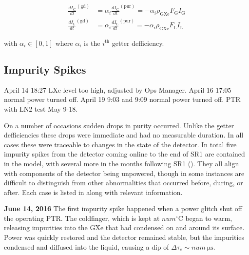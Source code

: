 \begin{subequations}
\begin{align}
\frac{dI_{\mathrm{G}}}{dt}^{(\mathrm{gd})} &= \alpha_i \frac{dI_{\mathrm{G}}}{dt}^{(\mathrm{pur})} =
-\alpha_i \rho_{\mathrm{GXe}} F_{\mathrm{G}} I_{\mathrm{G}}
\label{eq:electron_lifetime_model_detector_effects_getter_gxe}
\\
\frac{dI_{\mathrm{L}}}{dt}^{(\mathrm{gd})} &= \alpha_i \frac{dI_{\mathrm{L}}}{dt}^{(\mathrm{pur})} =
-\alpha_i \rho_{\mathrm{GXe}} F_{\mathrm{L}} I_{\mathrm{L}}
\label{eq:electron_lifetime_model_detector_effects_getter_lxe}
\end{align}
\end{subequations}

\noindent with $\alpha_i \in [0, 1]$ where $\alpha_i$ is the $i^{\mathrm{th}}$ getter defficiency.



\subsection{Impurity Spikes}
\label{subsec:electron_lifetime_model_detector_effects_spikes}
April 14 18:27 LXe level too high, adjusted by Ops Manager.  April 16 17:05 normal power turned off.  April 19 9:03 and 9:09 normal power
turned off.  PTR with LN2 test May 9-18.

On a number of occasions sudden drops in purity occurred.  Unlike the getter defficiencies these drops were immediate and
had no measurable duration.  In all cases these were traceable to changes in the state of the detector.  In total five impurity spikes
from the detector coming online to the end of SR1 are contained in the model, with several more in the months following SR1
().  They all align with components of the detector being unpowered, though in some
instances are difficult to distinguish from other abnormalities that occurred before, during, or after.  Each case is listed in
 along with relevant information.

\textbf{June 14, 2016}  The first impurity spike happened when a power glitch shut off the operating PTR.  The coldfinger,
which is kept at $num^{\circ} \mathrm{C}$ began to warm, releasing impurities into the GXe that had condensed on and around its
surface.  Power was quickly restored and the detector remained stable, but the impurities condensed and diffused into the liquid,
causing a dip of $\Delta \tau_e \sim num\ \mathrm{\mu s}$.


